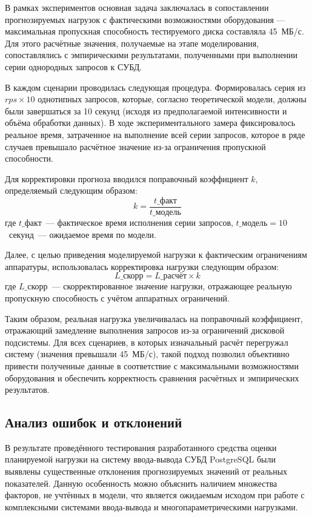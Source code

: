 В рамках экспериментов основная задача заключалась в сопоставлении прогнозируемых нагрузок с фактическими возможностями 
оборудования — максимальная пропускная способность тестируемого диска составляла 45~МБ/с. Для этого расчётные значения, 
получаемые на этапе моделирования, сопоставлялись с эмпирическими результатами, полученными при выполнении серии однородных запросов к СУБД.

В каждом сценарии проводилась следующая процедура. Формировалась серия из $rps \times 10$ однотипных запросов, 
которые, согласно теоретической модели, должны были завершаться за 10 секунд (исходя из предполагаемой интенсивности 
и объёма обработки данных). В ходе экспериментального замера фиксировалось реальное время, затраченное на выполнение 
всей серии запросов, которое в ряде случаев превышало расчётное значение из-за ограничения пропускной способности.

Для корректировки прогноза вводился поправочный коэффициент $k$, определяемый следующим образом:
\begin{equation}
    k = \frac{t\_{\text{факт}}}{t\_{\text{модель}}}
\end{equation}
где $t\_{\text{факт}}$~--- фактическое время исполнения серии запросов, $t\_{\text{модель}} = 10$~секунд~--- ожидаемое время по модели.

Далее, с целью приведения моделируемой нагрузки к фактическим ограничениям аппаратуры, использовалась корректировка нагрузки следующим образом:
\begin{equation}
    L\_{\text{скорр}} = L\_{\text{расчёт}} \times k
\end{equation}
где $L\_{\text{скорр}}$~--- скорректированное значение нагрузки, отражающее реальную пропускную способность с учётом аппаратных ограничений.

Таким образом, реальная нагрузка увеличивалась на поправочный коэффициент, отражающий замедление выполнения запросов из-за ограничений дисковой подсистемы. 
Для всех сценариев, в которых изначальный расчёт перегружал систему (значения превышали 45~МБ/с), 
такой подход позволил объективно привести полученные данные в соответствие с максимальными возможностями 
оборудования и обеспечить корректность сравнения расчётных и эмпирических результатов.

\subsection{Анализ ошибок и отклонений}

В результате проведённого тестирования разработанного средства оценки планируемой нагрузки на систему ввода-вывода СУБД PostgreSQL 
были выявлены существенные отклонения прогнозируемых значений от реальных показателей. Данную особенность можно объяснить наличием 
множества факторов, не учтённых в модели, что является ожидаемым исходом при работе с комплексными системами ввода-вывода и многопараметрическими нагрузками.

